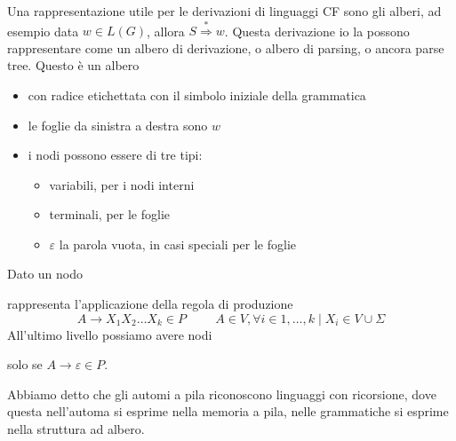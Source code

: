 \documentclass[12pt]{report}
\theoremstyle{definition}
\begin{document}
Una rappresentazione utile per le derivazioni di linguaggi CF sono gli alberi, ad esempio data $w \in L(G)$, allora $S \overset{*}{\Rightarrow} w$.
Questa derivazione io la possono rappresentare come un albero di derivazione, o albero di parsing, o ancora parse tree.
Questo è un albero 
\begin{itemize}
	\item con radice etichettata con il simbolo iniziale della grammatica
	\item le foglie da sinistra a destra sono $w$
	\item i nodi possono essere di tre tipi:
		\begin{itemize}
			\item variabili, per i nodi interni
			\item terminali, per le foglie
			\item $\varepsilon$ la parola vuota, in casi speciali per le foglie
		\end{itemize}
\end{itemize}
Dato un nodo
\begin{center}
\end{center}
rappresenta l'applicazione della regola di produzione
$$ A \rightarrow X_1 X_2 \dots X_k \in P \hspace{1cm} A \in V, \forall i \in 1, \dots, k \mid X_i \in V \cup \Sigma $$
All'ultimo livello possiamo avere nodi
\begin{center}
\end{center}
solo se $A \rightarrow \varepsilon \in P$.

Abbiamo detto che gli automi a pila riconoscono linguaggi con ricorsione, dove questa nell'automa si esprime nella memoria a pila, nelle grammatiche si esprime nella struttura ad albero.
 
\end{document}
